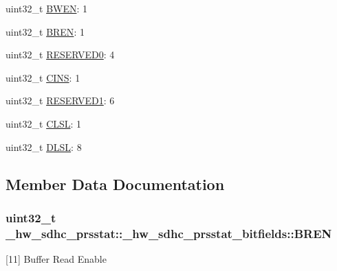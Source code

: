 \begin{DoxyCompactItemize}
\item 
uint32\+\_\+t \hyperlink{struct__hw__sdhc__prsstat_1_1__hw__sdhc__prsstat__bitfields_aaf271b9ae414fc00ee0927727689add1}{B\+W\+EN}\+: 1
\item 
uint32\+\_\+t \hyperlink{struct__hw__sdhc__prsstat_1_1__hw__sdhc__prsstat__bitfields_a46c666e3fe5bee3beb536bcfd685b5e9}{B\+R\+EN}\+: 1
\item 
uint32\+\_\+t \hyperlink{struct__hw__sdhc__prsstat_1_1__hw__sdhc__prsstat__bitfields_aa39108e49beae50f7ac2ad726692a5ba}{R\+E\+S\+E\+R\+V\+E\+D0}\+: 4
\item 
uint32\+\_\+t \hyperlink{struct__hw__sdhc__prsstat_1_1__hw__sdhc__prsstat__bitfields_a0d5e24132de48e77bc575b2c08f8120a}{C\+I\+NS}\+: 1
\item 
uint32\+\_\+t \hyperlink{struct__hw__sdhc__prsstat_1_1__hw__sdhc__prsstat__bitfields_adc1d9439238d9e5c0fcc05ee86a5ab78}{R\+E\+S\+E\+R\+V\+E\+D1}\+: 6
\item 
uint32\+\_\+t \hyperlink{struct__hw__sdhc__prsstat_1_1__hw__sdhc__prsstat__bitfields_ac5490e95952c2bf414955cc306ac1358}{C\+L\+SL}\+: 1
\item 
uint32\+\_\+t \hyperlink{struct__hw__sdhc__prsstat_1_1__hw__sdhc__prsstat__bitfields_ab444b0f8c6e7fca4f97be8fab9741672}{D\+L\+SL}\+: 8
\end{DoxyCompactItemize}


\subsection{Member Data Documentation}
\subsubsection[{\texorpdfstring{B\+R\+EN}{BREN}}]{\setlength{\rightskip}{0pt plus 5cm}uint32\+\_\+t \+\_\+hw\+\_\+sdhc\+\_\+prsstat\+::\+\_\+hw\+\_\+sdhc\+\_\+prsstat\+\_\+bitfields\+::\+B\+R\+EN}\hypertarget{struct__hw__sdhc__prsstat_1_1__hw__sdhc__prsstat__bitfields_a46c666e3fe5bee3beb536bcfd685b5e9}{}\label{struct__hw__sdhc__prsstat_1_1__hw__sdhc__prsstat__bitfields_a46c666e3fe5bee3beb536bcfd685b5e9}
\mbox{[}11\mbox{]} Buffer Read Enable 
